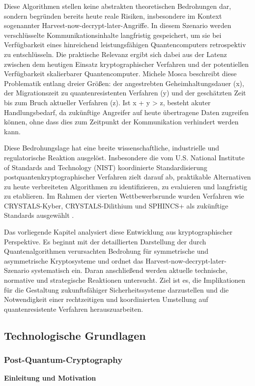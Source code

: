 Diese Algorithmen stellen keine abstrakten theoretischen Bedrohungen dar, sondern begründen bereits heute reale Risiken, insbesondere im Kontext sogenannter Harvest-now-decrypt-later-Angriffe. In diesem Szenario werden verschlüsselte Kommunikationsinhalte langfristig gespeichert, um sie bei Verfügbarkeit eines hinreichend leistungsfähigen Quantencomputers retrospektiv zu entschlüsseln. Die praktische Relevanz ergibt sich dabei aus der Latenz zwischen dem heutigen Einsatz kryptographischer Verfahren und der potentiellen Verfügbarkeit skalierbarer Quantencomputer. Michele Mosca beschreibt diese Problematik entlang dreier Größen: der angestrebten Geheimhaltungsdauer (x), der Migrationszeit zu quantenresistenten Verfahren (y) und der geschätzten Zeit bis zum Bruch aktueller Verfahren (z). Ist x + y > z, besteht akuter Handlungsbedarf, da zukünftige Angreifer auf heute übertragene Daten zugreifen können, ohne dass dies zum Zeitpunkt der Kommunikation verhindert werden kann. \cite{mosca_et_al_cybersecurity_2018}

Diese Bedrohungslage hat eine breite wissenschaftliche, industrielle und regulatorische Reaktion ausgelöst. Insbesondere die vom U.S. National Institute of Standards and Technology (NIST) koordinierte Standardisierung postquantenkryptographischer Verfahren zielt darauf ab, praktikable Alternativen zu heute verbreiteten Algorithmen zu identifizieren, zu evaluieren und langfristig zu etablieren. Im Rahmen der vierten Wettbewerbsrunde wurden Verfahren wie CRYSTALS-Kyber, CRYSTALS-Dilithium und SPHINCS+ als zukünftige Standards ausgewählt \cite{alagic_status_2025}.

Das vorliegende Kapitel analysiert diese Entwicklung aus kryptographischer Perspektive. Es beginnt mit der detaillierten Darstellung der durch Quantenalgorithmen verursachten Bedrohung für symmetrische und asymmetrische Kryptosysteme und ordnet das Harvest-now-decrypt-later-Szenario systematisch ein. Daran anschließend werden aktuelle technische, normative und strategische Reaktionen untersucht. Ziel ist es, die Implikationen für die Gestaltung zukunftsfähiger Sicherheitssysteme darzustellen und die Notwendigkeit einer rechtzeitigen und koordinierten Umstellung auf quantenresistente Verfahren herauszuarbeiten.


\subsection{Technologische Grundlagen}
\subsubsection{Post-Quantum-Cryptography}
\noindent\textbf{Einleitung und Motivation}

